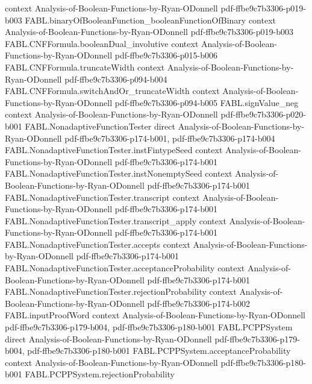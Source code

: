 \begin{theorem}
  {context}
  {Analysis-of-Boolean-Functions-by-Ryan-ODonnell}
  {pdf-ffbe9c7b3306-p019-b003}
\proofstep
  {FABL.binaryOfBooleanFunction_booleanFunctionOfBinary}
  {context}
  {Analysis-of-Boolean-Functions-by-Ryan-ODonnell}
  {pdf-ffbe9c7b3306-p019-b003}
\proofstep
  {FABL.CNFFormula.booleanDual_involutive}
  {context}
  {Analysis-of-Boolean-Functions-by-Ryan-ODonnell}
  {pdf-ffbe9c7b3306-p015-b006}
\proofstep
  {FABL.CNFFormula.truncateWidth}
  {context}
  {Analysis-of-Boolean-Functions-by-Ryan-ODonnell}
  {pdf-ffbe9c7b3306-p094-b004}
\proofstep
  {FABL.CNFFormula.switchAndOr_truncateWidth}
  {context}
  {Analysis-of-Boolean-Functions-by-Ryan-ODonnell}
  {pdf-ffbe9c7b3306-p094-b005}
\proofstep
  {FABL.signValue_neg}
  {context}
  {Analysis-of-Boolean-Functions-by-Ryan-ODonnell}
  {pdf-ffbe9c7b3306-p020-b001}
\proofstep
  {FABL.NonadaptiveFunctionTester}
  {direct}
  {Analysis-of-Boolean-Functions-by-Ryan-ODonnell}
  {pdf-ffbe9c7b3306-p174-b001,
    pdf-ffbe9c7b3306-p174-b004}
\proofstep
  {FABL.NonadaptiveFunctionTester.instFintypeSeed}
  {context}
  {Analysis-of-Boolean-Functions-by-Ryan-ODonnell}
  {pdf-ffbe9c7b3306-p174-b001}
\proofstep
  {FABL.NonadaptiveFunctionTester.instNonemptySeed}
  {context}
  {Analysis-of-Boolean-Functions-by-Ryan-ODonnell}
  {pdf-ffbe9c7b3306-p174-b001}
\proofstep
  {FABL.NonadaptiveFunctionTester.transcript}
  {context}
  {Analysis-of-Boolean-Functions-by-Ryan-ODonnell}
  {pdf-ffbe9c7b3306-p174-b001}
\proofstep
  {FABL.NonadaptiveFunctionTester.transcript_apply}
  {context}
  {Analysis-of-Boolean-Functions-by-Ryan-ODonnell}
  {pdf-ffbe9c7b3306-p174-b001}
\proofstep
  {FABL.NonadaptiveFunctionTester.accepts}
  {context}
  {Analysis-of-Boolean-Functions-by-Ryan-ODonnell}
  {pdf-ffbe9c7b3306-p174-b001}
\proofstep
  {FABL.NonadaptiveFunctionTester.acceptanceProbability}
  {context}
  {Analysis-of-Boolean-Functions-by-Ryan-ODonnell}
  {pdf-ffbe9c7b3306-p174-b001}
\proofstep
  {FABL.NonadaptiveFunctionTester.rejectionProbability}
  {context}
  {Analysis-of-Boolean-Functions-by-Ryan-ODonnell}
  {pdf-ffbe9c7b3306-p174-b002}
\proofstep
  {FABL.inputProofWord}
  {context}
  {Analysis-of-Boolean-Functions-by-Ryan-ODonnell}
  {pdf-ffbe9c7b3306-p179-b004,
    pdf-ffbe9c7b3306-p180-b001}
\proofstep
  {FABL.PCPPSystem}
  {direct}
  {Analysis-of-Boolean-Functions-by-Ryan-ODonnell}
  {pdf-ffbe9c7b3306-p179-b004,
    pdf-ffbe9c7b3306-p180-b001}
\proofstep
  {FABL.PCPPSystem.acceptanceProbability}
  {context}
  {Analysis-of-Boolean-Functions-by-Ryan-ODonnell}
  {pdf-ffbe9c7b3306-p180-b001}
\proofstep
  {FABL.PCPPSystem.rejectionProbability}

\end{theorem}
